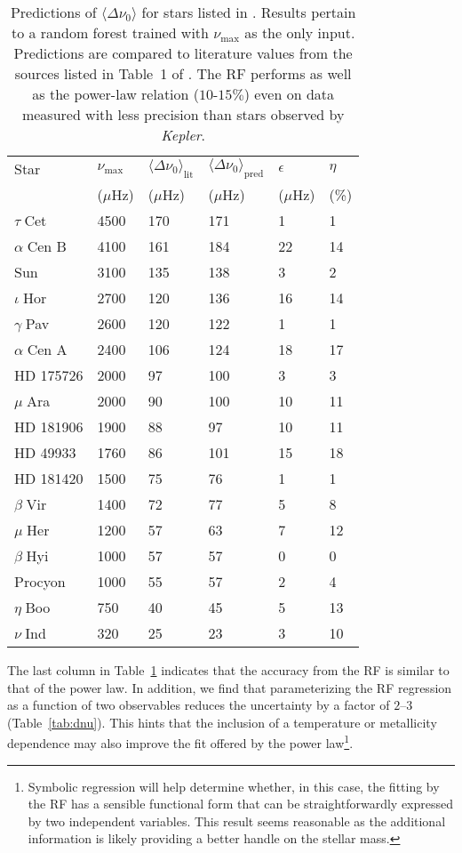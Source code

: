 \begin{table}
\centering
\caption{Predictions of ${\langle\Delta\nu_0\rangle}$ for stars listed in \citet{2009MNRAS.400L..80S}. Results pertain to a random forest trained with $\nu_{\max}$ as the only input. Predictions are compared to literature values from the sources listed in Table~1 of  \citet{2009MNRAS.400L..80S}. The RF performs as well as the power-law relation ($10$-$15\%$) even on data measured with less precision than stars observed by \emph{Kepler}.}
\label{tab:stello}
\begin{tabular}{llllll}
\hline  \hline
Star & $\nu_{\max}$ & $\langle\Delta\nu_0\rangle_{\text{lit}}$ & $\langle\Delta\nu_0\rangle_{\text{pred}}$ & $\epsilon$ & $\eta$  \\ 
& ($\mu$Hz) & ($\mu$Hz)  &($\mu$Hz) &($\mu$Hz) & (\%) \\ \hline
$\tau\;$Cet &4500 & 170 & 171 & 1  & 1  \\
$\alpha\;$Cen B &4100 & 161 & 184 & 22& 14  \\
Sun &3100 & 135 & 138 & 3 & 2    \\
$\iota\;$Hor &2700 & 120   & 136 &  16&14  \\
$\gamma\;$Pav  &2600 & 120 & 122 & 1  & 1  \\
$\alpha\;$Cen A &2400 & 106 & 124 & 18 & 17  \\
HD 175726 &2000 & 97    & 100 & 3  & 3  \\
$\mu\;$Ara &2000 & 90    & 100 & 10 & 11  \\
HD 181906 &1900 & 88  & 97  & 10 & 11 \\
HD 49933 &1760 & 86  & 101 & 15 & 18  \\
HD 181420 &1500 & 75    & 76  & 1  & 1  \\
$\beta\;$Vir &1400 & 72    & 77   & 5 & 8  \\
$\mu\;$Her  &1200 & 57  & 63   & 7 & 12  \\
$\beta\;$Hyi &1000 & 57  & 57  & 0  & 0  \\
Procyon &1000 & 55    & 57 & 2 & 4    \\
$\eta\;$Boo &750  & 40  & 45   & 5 & 13  \\
$\nu\;$Ind &320  & 25  & 23  & 3 & 10  \\ \hline
\end{tabular}
\end{table}


The last column in Table~\ref{tab:stello} indicates that the accuracy from the RF is similar to that of the power law. In addition, we find that parameterizing the RF regression as a function of two observables reduces the uncertainty by a factor of $2$--$3$   (Table~\ref{tab:dnu}).
This hints that the inclusion of a temperature or metallicity dependence may also improve the fit offered by the power law\footnote{Symbolic regression will help determine whether, in this case, the fitting by the RF has a sensible functional form that can be straightforwardly expressed by two independent variables. This result seems reasonable as the additional information is likely providing a better handle on the stellar mass.}. 
 
